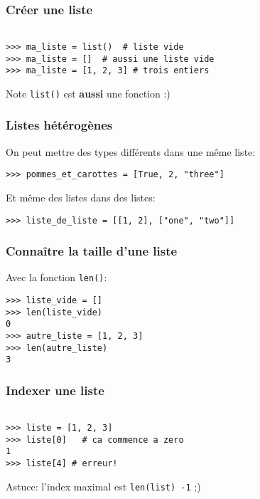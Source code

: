 \documentclass{beamer}
\begin{document}
\begin{frame}[fragile]
  \frametitle{Créer une liste}
\begin{lstlisting}

>>> ma_liste = list()  # liste vide
>>> ma_liste = []  # aussi une liste vide
>>> ma_liste = [1, 2, 3] # trois entiers

\end{lstlisting}

\vfill

\begin{alertblock}{Note}
  \texttt{list()} est \textbf{aussi} une fonction :)
\end{alertblock}

\end{frame}

\begin{frame}[fragile]
  \frametitle{Listes hétérogènes}

On peut mettre des types différents dans une même liste:

\begin{lstlisting}
>>> pommes_et_carottes = [True, 2, "three"]
\end{lstlisting}

\vfill
Et même des listes dans des listes:

\begin{lstlisting}
>>> liste_de_liste = [[1, 2], ["one", "two"]]
\end{lstlisting}


\end{frame}


\begin{frame}[fragile]
  \frametitle{Connaître la taille d'une liste}
Avec la fonction \texttt{len()}:

\vfill

\begin{lstlisting}
>>> liste_vide = []
>>> len(liste_vide)
0
>>> autre_liste = [1, 2, 3]
>>> len(autre_liste)
3
\end{lstlisting}

\end{frame}



\begin{frame}[fragile]
  \frametitle{Indexer une liste}

\begin{lstlisting}

>>> liste = [1, 2, 3]
>>> liste[0]   # ca commence a zero
1
>>> liste[4] # erreur!
\end{lstlisting}

\vfill

Astuce: l'index maximal est \texttt{len(list) -1} ;)

\end{frame}
\end{document}

